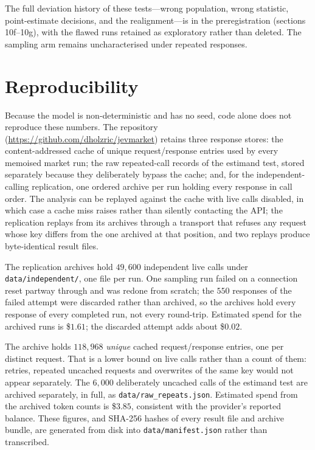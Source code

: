 \documentclass[11pt]{article}
\begin{document}
The full deviation history of these tests---wrong population, wrong statistic,
point-estimate decisions, and the realignment---is in the preregistration
(sections 10f--10g), with the flawed runs retained as exploratory rather than
deleted. The sampling arm remains uncharacterised under repeated responses.

\section{Reproducibility}

Because the model is non-deterministic and has no seed, code alone does not
reproduce these numbers. The repository
(\url{https://github.com/dholzric/jevmarket}) retains three response stores: the
content-addressed cache of unique request/response entries used by every
memoised market run; the raw repeated-call records of the estimand test, stored
separately because they deliberately bypass the cache; and, for the
independent-calling replication, one ordered archive per run holding every
response in call order. The analysis can be replayed against the cache with
live calls disabled, in which case a cache miss raises rather than silently
contacting the API; the replication replays from its archives through a
transport that refuses any request whose key differs from the one archived at
that position, and two replays produce byte-identical result files.

The replication archives hold $49{,}600$ independent live calls under
\texttt{data/independent/}, one file per run. One sampling run failed on a connection
reset partway through and was redone from scratch; the $550$ responses of the
failed attempt were discarded rather than archived, so the archives hold every
response of every completed run, not every round-trip. Estimated spend for the
archived runs is \$$1.61$; the discarded attempt adds about \$$0.02$.

The archive holds $118{,}968$ \emph{unique} cached request/response entries, one per distinct
request. That is a lower bound on live calls rather than a count of them:
retries, repeated uncached requests and overwrites of the same key would not
appear separately. The $6{,}000$ deliberately uncached calls of the estimand test are
archived separately, in full, as \texttt{data/raw\_repeats.json}. Estimated
spend from the archived token counts is
\$$3.85$, consistent with the provider's reported balance. These figures, and
SHA-256 hashes of every result file and archive bundle, are generated from disk
into \texttt{data/manifest.json} rather than transcribed.
\end{document}
